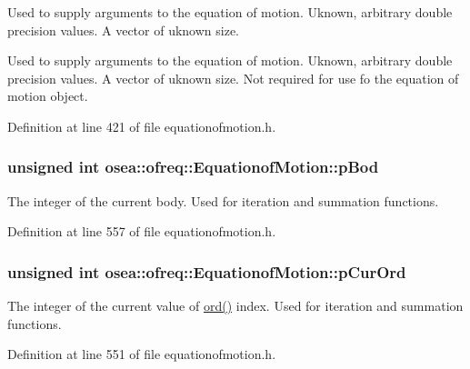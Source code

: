 Used to supply arguments to the equation of motion. Uknown, arbitrary double precision values. A vector of uknown size. 

Used to supply arguments to the equation of motion. Uknown, arbitrary double precision values. A vector of uknown size. Not required for use fo the equation of motion object. 

Definition at line 421 of file equationofmotion.\-h.

\hypertarget{classosea_1_1ofreq_1_1_equationof_motion_a5a1c11c4c4a827494a7772af0d0dddc6}{
\subsubsection[{p\-Bod}]{\setlength{\rightskip}{0pt plus 5cm}unsigned int osea\-::ofreq\-::\-Equationof\-Motion\-::p\-Bod\hspace{0.3cm}{\ttfamily [protected]}}}\label{classosea_1_1ofreq_1_1_equationof_motion_a5a1c11c4c4a827494a7772af0d0dddc6}


The integer of the current body. Used for iteration and summation functions. 



Definition at line 557 of file equationofmotion.\-h.

\hypertarget{classosea_1_1ofreq_1_1_equationof_motion_a39d41e27dcf84f163ef794a9287a0ef1}{
\subsubsection[{p\-Cur\-Ord}]{\setlength{\rightskip}{0pt plus 5cm}unsigned int osea\-::ofreq\-::\-Equationof\-Motion\-::p\-Cur\-Ord\hspace{0.3cm}{\ttfamily [protected]}}}\label{classosea_1_1ofreq_1_1_equationof_motion_a39d41e27dcf84f163ef794a9287a0ef1}


The integer of the current value of \hyperlink{classosea_1_1ofreq_1_1_equationof_motion_a31f904818ce75c9e2a2b5cff9fc707a5}{ord()} index. Used for iteration and summation functions. 



Definition at line 551 of file equationofmotion.\-h.

